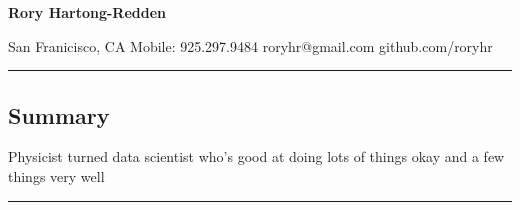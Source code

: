 \documentclass[10pt,letterpaper]{article}
\begin{document}
{\raggedright 
\LARGE{\bf Rory Hartong-Redden}\\}

{\raggedleft 
San Franicisco, CA \textbar\/ Mobile: 925.297.9484 \textbar\/ roryhr@gmail.com \textbar\/   github.com/roryhr\\}
\hrule


\vspace{-0.4em}
\subsection*{Summary}

\begin{centering}  
Physicist turned data scientist who's good at doing lots of things
 okay and a few things very well\\
\end{centering}

\vspace{0.4em}
	

\hrule
\vspace{-0.4em}
\end{document}

